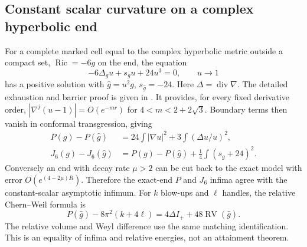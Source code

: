 \documentclass[11pt,a4paper]{article}
\theoremstyle{definition}\newtheorem{definition}[theorem]{Definition}
\theoremstyle{remark}\newtheorem{remark}[theorem]{Remark}
\newcommand{\Ric}{\operatorname{Ric}}
\begin{document}
\subsection{Constant scalar curvature on a complex hyperbolic end}
For a complete marked cell equal to the complex hyperbolic metric outside a compact set, $\Ric=-6g$ on the end, the equation
\begin{equation}\label{eq:Ycell}
 -6\Delta_g u+s_gu+24u^3=0,\qquad u\to1
\end{equation}
has a positive solution with $\widehat g=u^2g$, $s_{\widehat g}=-24$. Here $\Delta=\operatorname{div}\nabla$. The detailed exhaustion and barrier proof is given in \cite{RepoCells}. It provides, for every fixed derivative order,
$|\nabla^j(u-1)|=O(e^{-mr})$ for $4<m<2+2\sqrt3$. Boundary terms then vanish in conformal transgression, giving
\begin{align}
 P(g)-P(\widehat g)&=24\int|\nabla u|^2+3\int(\Delta u/u)^2,\label{eq:cellconformal}\\
 J_6(g)-J_6(\widehat g)&=P(g)-P(\widehat g)+\tfrac14\int(s_g+24)^2.
\end{align}
Conversely an end with decay rate $\mu>2$ can be cut back to the exact model with error $O(e^{(4-2\mu)R})$. Therefore the exact-end $P$ and $J_6$ infima agree with the constant-scalar asymptotic infimum. For $k$ blow-ups and $\ell$ handles, the relative Chern--Weil formula is
\begin{equation}\label{eq:relativecell}
 P(\widehat g)-8\pi^2(k+4\ell)=4\Delta I_++48\operatorname{RV}(\widehat g).
\end{equation}
The relative volume and Weyl difference use the same matching identification. This is an equality of infima and relative energies, not an attainment theorem.
\end{document}
